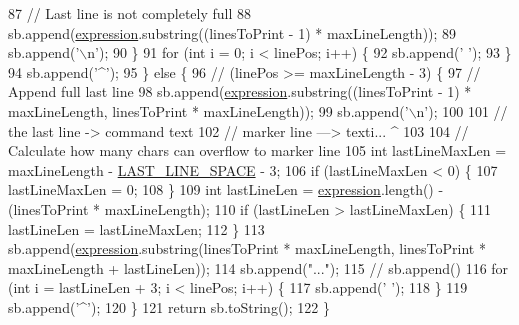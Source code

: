 \begin{DoxyCode}
87         \textcolor{comment}{// Last line is not completely full}
88         sb.append(\hyperlink{classgov_1_1nasa_1_1jpf_1_1inspector_1_1exceptions_1_1_j_p_f_inspector_parsing_error_exception_a534770d46b21ef3066d07b739e2340cd}{expression}.substring((linesToPrint - 1) * maxLineLength));
89         sb.append(\textcolor{charliteral}{'\(\backslash\)n'});
90       \}
91       \textcolor{keywordflow}{for} (\textcolor{keywordtype}{int} i = 0; i < linePos; i++) \{
92         sb.append(\textcolor{charliteral}{' '});
93       \}
94       sb.append(\textcolor{charliteral}{'^'});
95     \} \textcolor{keywordflow}{else} \{
96       \textcolor{comment}{// (linePos >= maxLineLength - 3) \{}
97       \textcolor{comment}{// Append full last line}
98       sb.append(\hyperlink{classgov_1_1nasa_1_1jpf_1_1inspector_1_1exceptions_1_1_j_p_f_inspector_parsing_error_exception_a534770d46b21ef3066d07b739e2340cd}{expression}.substring((linesToPrint - 1) * maxLineLength, linesToPrint * 
      maxLineLength));
99       sb.append(\textcolor{charliteral}{'\(\backslash\)n'});
100 
101       \textcolor{comment}{// the last line -> command text}
102       \textcolor{comment}{// marker line ---> texti... ^}
103 
104       \textcolor{comment}{// Calculate how many chars can overflow to marker line}
105       \textcolor{keywordtype}{int} lastLineMaxLen = maxLineLength - \hyperlink{classgov_1_1nasa_1_1jpf_1_1inspector_1_1exceptions_1_1_j_p_f_inspector_parsing_error_exception_afa19cfe2c47688fefc1f995c55a4df1a}{LAST\_LINE\_SPACE} - 3;
106       \textcolor{keywordflow}{if} (lastLineMaxLen < 0) \{
107         lastLineMaxLen = 0;
108       \}
109       \textcolor{keywordtype}{int} lastLineLen = \hyperlink{classgov_1_1nasa_1_1jpf_1_1inspector_1_1exceptions_1_1_j_p_f_inspector_parsing_error_exception_a534770d46b21ef3066d07b739e2340cd}{expression}.length() - (linesToPrint * maxLineLength);
110       \textcolor{keywordflow}{if} (lastLineLen > lastLineMaxLen) \{
111         lastLineLen = lastLineMaxLen;
112       \}
113       sb.append(\hyperlink{classgov_1_1nasa_1_1jpf_1_1inspector_1_1exceptions_1_1_j_p_f_inspector_parsing_error_exception_a534770d46b21ef3066d07b739e2340cd}{expression}.substring(linesToPrint * maxLineLength, linesToPrint * maxLineLength +
       lastLineLen));
114       sb.append(\textcolor{stringliteral}{"..."});
115       \textcolor{comment}{// sb.append()}
116       \textcolor{keywordflow}{for} (\textcolor{keywordtype}{int} i = lastLineLen + 3; i < linePos; i++) \{
117         sb.append(\textcolor{charliteral}{' '});
118       \}
119       sb.append(\textcolor{charliteral}{'^'});
120     \}
121     \textcolor{keywordflow}{return} sb.toString();
122   \}
\end{DoxyCode}

